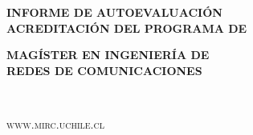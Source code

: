 \documentclass[11pt,fleqn]{book} %
\begin{document}

\begingroup
\thispagestyle{empty}
\centering
\vspace*{5cm}
\par\normalfont\fontsize{35}{35}\sffamily\selectfont
\textbf{INFORME DE AUTOEVALUACIÓN}\\
\vspace*{0.5cm}
{\Large \textbf{ACREDITACIÓN DEL PROGRAMA DE}}\par %
\vspace*{0.3cm}
{\Huge \textbf{MAGÍSTER EN INGENIERÍA DE\\ REDES DE COMUNICACIONES}}\par %
\endgroup


\newpage
~\vfill
\thispagestyle{empty}

\noindent \textsc{www.mirc.uchile.cl}\\ %






\pagestyle{empty} %

\tableofcontents %


\pagestyle{fancy} %
\end{document}
